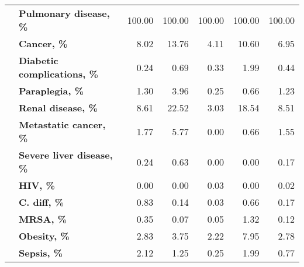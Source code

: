 \begin{tabular}{llrrrrr}
               & \textbf{Pulmonary disease, \%} &  100.00 &  100.00 &  100.00 &  100.00 &            100.00 \\
               & \textbf{Cancer, \%} &    8.02 &   13.76 &    4.11 &   10.60 &              6.95 \\
               & \textbf{Diabetic complications, \%} &    0.24 &    0.69 &    0.33 &    1.99 &              0.44 \\
               & \textbf{Paraplegia, \%} &    1.30 &    3.96 &    0.25 &    0.66 &              1.23 \\
               & \textbf{Renal disease, \%} &    8.61 &   22.52 &    3.03 &   18.54 &              8.51 \\
               & \textbf{Metastatic cancer, \%} &    1.77 &    5.77 &    0.00 &    0.66 &              1.55 \\
               & \textbf{Severe liver disease, \%} &    0.24 &    0.63 &    0.00 &    0.00 &              0.17 \\
               & \textbf{HIV, \%} &    0.00 &    0.00 &    0.03 &    0.00 &              0.02 \\
               & \textbf{C. diff, \%} &    0.83 &    0.14 &    0.03 &    0.66 &              0.17 \\
               & \textbf{MRSA, \%} &    0.35 &    0.07 &    0.05 &    1.32 &              0.12 \\
               & \textbf{Obesity, \%} &    2.83 &    3.75 &    2.22 &    7.95 &              2.78 \\
               & \textbf{Sepsis, \%} &    2.12 &    1.25 &    0.25 &    1.99 &              0.77 \\
\bottomrule
\end{tabular}
